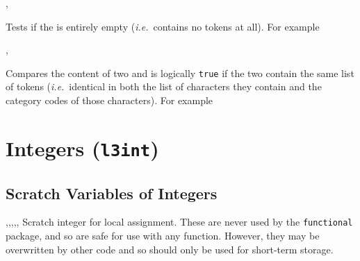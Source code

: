 \documentclass[oneside]{book}
\begin{document}
\begin{function}{\TlIfEmpty,\TlIfEmptyTF}
\begin{syntax}
 
   
\end{syntax}
Tests if the  is entirely empty
(\emph{i.e.}~contains no tokens at all). For example
\begin{demohigh}
\TlSet{}
\TlIfEmptyTF{}
\TlClear\lTmpaTl
\TlIfEmptyTF{}
\end{demohigh}
\end{function}

\begin{function}{\TlIfEq,\TlIfEqTF}
\begin{syntax}
  
    
\end{syntax}
Compares the content of two  and
is logically \texttt{true} if the two contain the same list of
tokens (\emph{i.e.}~identical in both the list of characters they
contain and the category codes of those characters). For example
\begin{demohigh}
\TlSet{}
\TlSet{}
\TlSet{}
\TlIfEqTF\lTmpaTl{}
\TlIfEqTF\lTmpaTl{}
\end{demohigh}
\end{function}

\chapter{Integers (\texttt{l3int})}

\section{Scratch Variables of Integers}

\begin{variable}{\lTmpaInt,\lTmpbInt,\lTmpcInt,\lTmpiInt,\lTmpjInt,\lTmpkInt}
Scratch integer for local assignment. These are never used by
the \verb!functional! package, and so are safe for use with any
function. However, they may be overwritten by other
code and so should only be used for short-term storage.
\end{variable}
\end{document}
